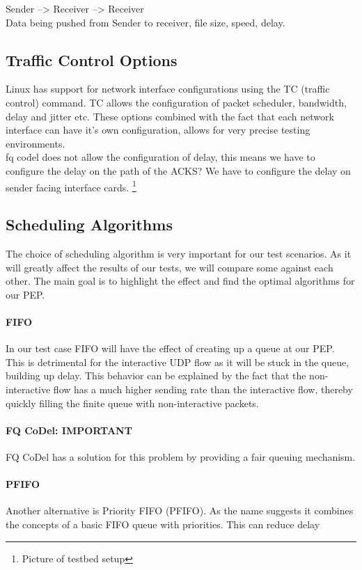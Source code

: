 \documentclass[a4paper,english, 11pt]{report}
\begin{document}
Sender --> Receiver --> Receiver
\\
Data being pushed from Sender to receiver, file size, speed, delay.
\subsection{Traffic Control Options}
Linux has support for network interface configurations using the TC (traffic control) command. TC allows the configuration of packet scheduler, bandwidth, delay and jitter etc. These options combined with the fact that each network interface can have it's own configuration, allows for very precise testing environments. 
\\
fq codel does not allow the configuration of delay, this means we have to configure the delay on the path of the ACKS?
We have to configure the delay on sender facing interface cards. 
\footnote{Picture of testbed setup} 

\subsection{Scheduling Algorithms}
The choice of scheduling algorithm is very important for our test scenarios. As it will greatly affect the results of our tests, we will compare some against each other. The main goal is to highlight the effect and find the optimal algorithms for our PEP.

\paragraph{FIFO}
In our test case FIFO will have the effect of creating up a queue at our PEP. This is detrimental for the interactive UDP flow as it will be stuck in the queue, building up delay. This behavior can be explained by the fact that the non-interactive flow has a much higher sending rate than the interactive flow, thereby quickly filling the finite queue with non-interactive packets.

\paragraph{FQ CoDel: IMPORTANT}
FQ CoDel has a solution for this problem by providing a fair queuing mechanism. 
\paragraph{PFIFO}
Another alternative is Priority FIFO (PFIFO). As the name suggests it combines the concepts of a basic FIFO queue with priorities. This can reduce delay
\end{document}
